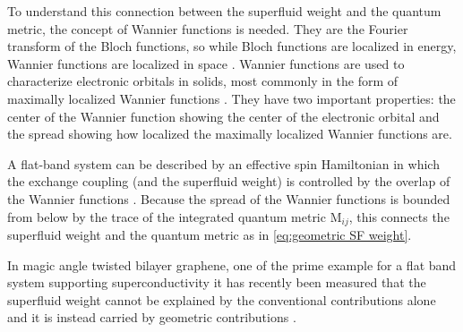 \documentclass[../main.tex]{subfiles}
\begin{document}
To understand this connection between the superfluid weight and the quantum metric, the concept of Wannier functions is needed.
They are the Fourier transform of the Bloch functions, so while Bloch functions are localized in energy, Wannier functions are localized in space \cite{marzariMaximallyLocalizedWannier2012}.
Wannier functions are used to characterize electronic orbitals in solids, most commonly in the form of maximally localized Wannier functions \cite{marzariMaximallyLocalizedGeneralized1997}.
They have two important properties: the center of the Wannier function showing the center of the electronic orbital and the spread showing how localized the maximally localized Wannier functions are.

A flat-band system can be described by an effective spin Hamiltonian in which the exchange coupling (and the superfluid weight) is controlled by the overlap of the Wannier functions \cite{tovmasyanEffectiveTheoryEmergent2016}.
Because the spread of the Wannier functions is bounded from below by the trace of the integrated quantum metric \(\mathrm{M}_{ij}\), this connects the superfluid weight and the quantum metric as in \cref{eq:geometric SF weight}.

In magic angle twisted bilayer graphene, one of the prime example for a flat band system supporting superconductivity it has recently been measured that the superfluid weight cannot be explained by the conventional contributions alone and it is instead carried by geometric contributions \cite{peottaSuperfluidityTopologicallyNontrivial2015, liangBandGeometryBerry2017, tanakaSuperfluidStiffnessMagicangle2025, tianEvidenceDiracFlat2023, xieTopologyBoundedSuperfluidWeight2020, huGeometricConventionalContribution2019}.
\end{document}
